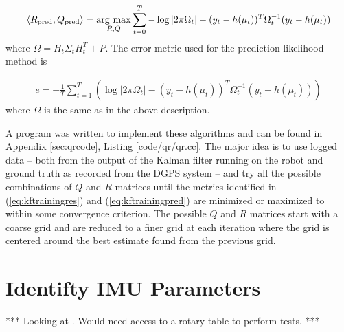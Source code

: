 \begin{align*}
\left<R_{\text{pred}},Q_{\text{pred}}\right> = \mathop{\arg\,\max}\limits_{R,Q}\sum_{t=0}^T -\log|2\pi\Omega_t| - (y_t-h(\mu_t))^T\Omega_t^{-1}(y_t-h(\mu_t))
\end{align*}
where $\Omega = H_t\Sigma_tH_t^T+P$. The error metric used for the prediction likelihood method is

\begin{align}
\label{eq:kftrainingpred}
e = -\frac{1}{T}\sum_{t=1}^T \left(\log|2\pi\Omega_t| - (y_t-h(\mu_t))^T\Omega_t^{-1}(y_t-h(\mu_t))\right)
\end{align}
where $\Omega$ is the same as in the above description.

A program was written to implement these algorithms and can be found in Appendix \ref{sec:qrcode}, Listing \ref{code/qr/qr.cc}. The major idea is to use logged data -- both from the output of the Kalman filter running on the robot and ground truth as recorded from the DGPS system -- and try all the possible combinations of $Q$ and $R$ matrices until the metrics identified in (\ref{eq:kftrainingres}) and (\ref{eq:kftrainingpred}) are minimized or maximized to within some convergence criterion. The possible $Q$ and $R$ matrices start with a coarse grid and are reduced to a finer grid at each iteration where the grid is centered around the best estimate found from the previous grid.

\section{Identifty IMU Parameters}
\label{sec:identifyimuparams}
*** Looking at \cite{ChungOjeda01}. Would need access to a rotary table to perform tests. ***